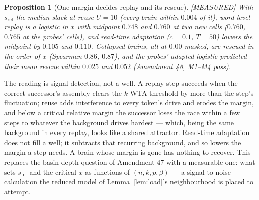 \documentclass[11pt]{article}
\theoremstyle{definition}
\theoremstyle{plain}
\newtheorem{proposition}[lemma]{Proposition}
\newcommand{\MEASURED}{\textnormal{\footnotesize\textsf{[MEASURED]}}}
\begin{document}
\begin{proposition}[One margin decides replay and its rescue]\label{prop:logitmargin} \MEASURED
With $s_{\mathrm{ref}}$ the median slack at reuse $U = 10$ (every brain within
$0.004$ of it), word-level replay is a logistic in $x$ with midpoint $0.748$ and
$0.760$ at two new cells ($0.760$, $0.765$ at the probes' cells), and read-time
adaptation ($c = 0.1$, $T = 50$) lowers the midpoint by $0.105$ and $0.110$.
Collapsed brains, all at $0.00$ masked, are rescued in the order of $x$
(Spearman $0.86$, $0.87$), and the probes' adapted logistic predicted their mean
rescue within $0.025$ and $0.052$ (Amendment 48, M1--M4 pass).
\end{proposition}

The reading is signal detection, not a well. A replay step succeeds when the
correct successor's assembly clears the $k$-WTA threshold by more than the
step's fluctuation; reuse adds interference to every token's drive and erodes
the margin, and below a critical relative margin the successor loses the race
within a few steps to whatever the background drives hardest --- which, being
the same background in every replay, looks like a shared attractor. Read-time
adaptation does not fill a well; it subtracts that recurring background, and so
lowers the margin a step needs. A brain whose margin is gone has nothing to
recover. This replaces the basin-depth question of Amendment 47 with a
measurable one: what sets $s_{\mathrm{ref}}$ and the critical $x$ as functions of
$(n,k,p,\beta)$ --- a signal-to-noise calculation the reduced model of
Lemma~\ref{lem:load}'s neighbourhood is placed to attempt.
\end{document}
